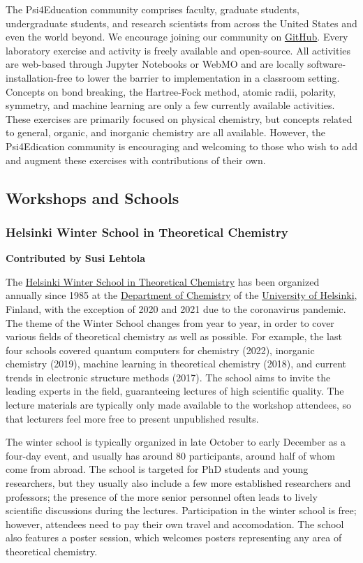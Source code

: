 \documentclass[9pt,review]{livecoms}
\begin{document}
The Psi4Education community comprises faculty, graduate students, undergraduate students, and research scientists from across the United States and even the world beyond.  
We encourage joining our community on \href{https://github.com/Psi4Education}{GitHub}.  
Every laboratory exercise and activity is freely available and open-source.  
All activities are web-based through Jupyter Notebooks or WebMO and are locally software-installation-free to lower the barrier to implementation in a classroom setting.  
Concepts on bond breaking, the Hartree-Fock method, atomic radii, polarity, symmetry, and machine learning are only a few currently available activities.  
These exercises are primarily focused on physical chemistry, but concepts related to general, organic, and inorganic chemistry are all available. 
However, the Psi4Edication community is encouraging and welcoming to those who wish to add and augment these exercises with contributions of their own.

\subsection{Workshops and Schools}

\subsubsection{Helsinki Winter School in Theoretical Chemistry}

\textbf{Contributed by Susi Lehtola}

The \href{http://www.chem.helsinki.fi/ws.html}{Helsinki Winter School in
Theoretical Chemistry} has been organized annually
since 1985 at the \href{http://www.chem.helsinki.fi/}{Department of Chemistry}
of the \href{www.helsinki.fi/}{University of Helsinki}, Finland, with the
exception of 2020 and 2021 due to the coronavirus pandemic. The theme of the
Winter School changes from year to year, in order to cover various fields of
theoretical chemistry as well as possible. For example, the last four schools
covered quantum computers for chemistry (2022), inorganic chemistry (2019),
machine learning in theoretical chemistry (2018), and current trends in
electronic structure methods (2017). The school aims to invite the leading 
experts in the field, guaranteeing lectures of high scientific quality. The
lecture materials are typically only made available to the workshop attendees,
so that lecturers feel more free to present unpublished results.

The winter school is typically organized in late October to early December as a
four-day event, and usually has around 80 participants, around half of whom come
from abroad. The school is targeted for PhD students and young researchers, but
they usually also include a few more established researchers and professors; the
presence of the more senior personnel often leads to lively scientific
discussions during the lectures. Participation in the winter school is free;
however, attendees need to pay their own travel and accomodation. The school
also features a poster session, which welcomes posters representing any area of
theoretical chemistry.
\end{document}
